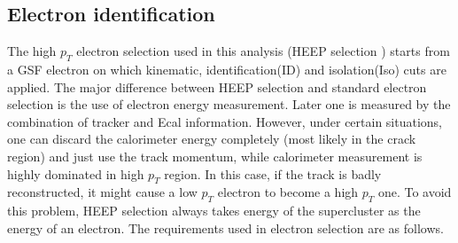 \subsection{Electron identification}
\label{sec:ElectronID}The high $p_{T}$ electron selection used in this analysis (HEEP selection \cite{heepeid}) starts from a GSF electron on which kinematic, identification(ID) and isolation(Iso) cuts are applied. The major difference between HEEP selection and standard electron selection is the use of electron energy measurement. Later one is measured by the combination of tracker and Ecal information. However, under certain situations, one can discard the calorimeter energy completely (most likely in the crack region) and just use the track momentum, while calorimeter measurement is highly dominated in high $p_{T}$ region. In this case, if the track is badly reconstructed, it might cause a low $p_{T}$ electron to become a high $p_{T}$ one. To avoid this problem, HEEP selection always takes energy of the supercluster as the energy of an electron. The requirements used in electron selection are as follows.
